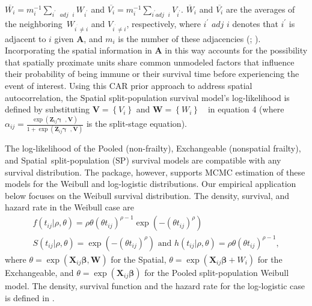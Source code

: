 \noindent $\overline{W_{i}}=m_{i}^{-1}\sum_{i^{\prime}\text{ }adj\text{ }%
i}W_{i^{\prime}}$ and $\overline{V_{i}}=m_{i}^{-1}\sum_{i^{\prime}\text{
}adj\text{ }i}V_{i^{\prime}}$. $\overline{W}_{i}$ and $\overline{V_{i}}$ are
the averages of the neighboring\ $W_{i^{^{\prime}}\neq i}$ and $V_{i^{^{\prime
}}\neq i}$, respectively, where $i^{\prime}$ $adj$ $i$ denotes that $i^{\prime}$
is adjacent to $i$ given $\mathbf{A}$, and $m_{i}$ is the number of
these adjacencies (\citealp[989]{bernardinelli1992}; \citealp{thomas2004geobugs, banerjee2003frailty}). Incorporating the spatial information in $\mathbf{A}$ in this way accounts for
the possibility that spatially proximate units share common unmodeled factors
that influence their probability of being immune or their
survival time before experiencing the event of interest. Using this CAR prior
approach to address spatial autocorrelation, the Spatial split-population
survival model's log-likelihood is defined by 
substituting $\mathbf{V=}\left\{  V_{i}\right\}$ and $\mathbf{W=}\left\{
W_{i}\right\}  $\ \ in equation 4 (where $\alpha_{ij}=\frac{\exp
\left(\mathbf{Z}_{ij}\boldsymbol{\gamma}\text{ },\mathbf{V}\right)}{1+\exp\left(\mathbf{Z}%
_{ij}\boldsymbol{\gamma}\text{ }\boldsymbol{,}\mathbf{V}\right)}$ is the split-stage equation).


The log-likelihood of the Pooled (non-frailty), Exchangeable (nonspatial
frailty), and Spatial\ split-population (SP) survival models are compatible with any
survival distribution. The  package, however,
supports MCMC estimation of these models for the Weibull and
log-logistic distributions. Our empirical application below focuses on the Weibull survival distribution. The density, survival, and hazard rate in the Weibull case are%
\begin{equation}
\begin{gathered}
f\left(t_{ij}|\rho,\theta\right)=\rho\theta\left(\theta t_{ij}\right)^{\rho-1}\exp\left(-\left(\theta
t_{ij}\right)^{\rho}\right)\\
S\left(t_{ij}|\rho,\theta\right)=\exp\left(-\left(\theta t_{ij}\right)^{\rho}\right)\text{ and }h\left(t_{ij}
|\rho,\theta\right)=\rho\theta\left(\theta t_{ij}\right)^{\rho-1},
\end{gathered}
\end{equation}
where $\theta=\exp\left(\mathbf{X}_{ij}\boldsymbol{\beta},\mathbf{W}\right)$ for the
Spatial, $\theta=\exp\left(\mathbf{X}_{ij}\boldsymbol{\beta}+W_{i}\right)$ for the
Exchangeable, and $\theta=\exp\left(\mathbf{X}_{ij}\boldsymbol{\beta}\right)$ for the
Pooled split-population Weibull model. The density, survival function and the
hazard rate for the log-logistic case is defined in \citet{Bolte2021}.

